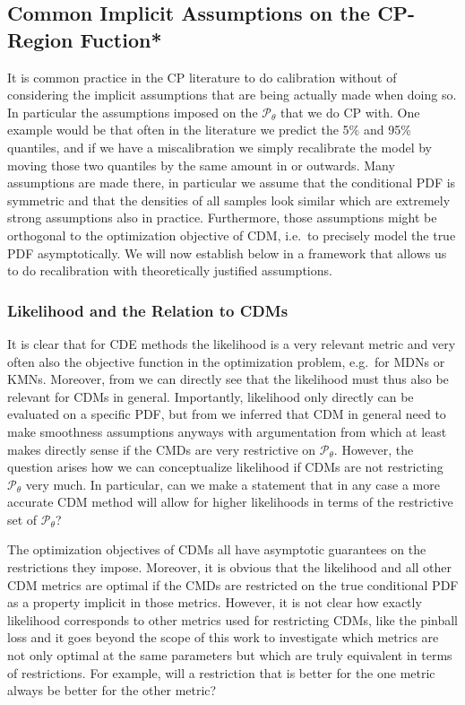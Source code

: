 \subsection{Common Implicit Assumptions on the CP-Region Fuction*}\label{sec:implicit_assumptions_cp}

It is common practice in the CP literature to do calibration without of considering the implicit assumptions that are being actually made when doing so. In particular the assumptions imposed on the $\mathscr{P}_\theta$ that we do CP with. One example would be that often in the literature we predict the 5\% and 95\% quantiles, and if we have a miscalibration we simply recalibrate the model by moving those two quantiles by the same amount in or outwards. Many assumptions are made there, in particular we assume that the conditional PDF is symmetric and that the densities of all samples look similar which are extremely strong assumptions also in practice. Furthermore, those assumptions might be orthogonal to the optimization objective of CDM, i.e.\ to precisely model the true PDF asymptotically. We will now establish below in  a framework that allows us to do recalibration with theoretically justified assumptions.

\subsubsection{Likelihood and the Relation to CDMs}\label{sec:shape_importance}

It is clear that for CDE methods the likelihood is a very relevant metric and very often also the objective function in the optimization problem, e.g.\ for MDNs or KMNs. Moreover, from  we can directly see that the likelihood must thus also be relevant for CDMs in general. Importantly, likelihood only directly can be evaluated on a specific PDF, but from  we inferred that CDM in general need to make smoothness assumptions anyways with argumentation from  which at least makes directly sense if the CMDs are very restrictive on $\mathscr{P}_\theta$. However, the question arises how we can conceptualize likelihood if CDMs are not restricting $\mathscr{P}_\theta$ very much. In particular, can we make a statement that in any case a more accurate CDM method will allow for higher likelihoods in terms of the restrictive set of $\mathscr{P}_\theta$?

The optimization objectives of CDMs all have asymptotic guarantees on the restrictions they impose. Moreover, it is obvious that the likelihood and all other CDM metrics are optimal if the CMDs are restricted on the true conditional PDF as a property implicit in those metrics. However, it is not clear how exactly likelihood corresponds to other metrics used for restricting CDMs, like the pinball loss and it goes beyond the scope of this work to investigate which metrics are not only optimal at the same parameters but which are truly equivalent in terms of restrictions. For example, will a restriction that is better for the one metric always be better for the other metric?

